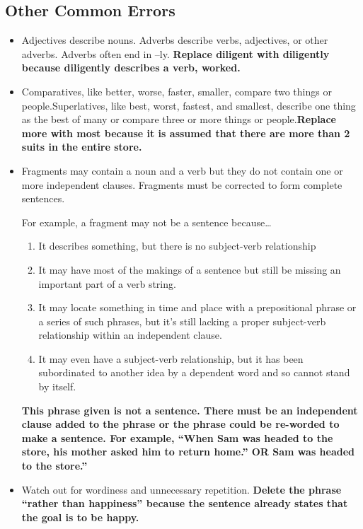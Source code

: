 \subsection{Other Common Errors}

\begin{itemize} 

\item Adjectives describe nouns. Adverbs describe verbs, adjectives, or other adverbs.  Adverbs often end in –ly. \textbf{Replace diligent with diligently because diligently describes a verb, worked.}

\item Comparatives, like better, worse, faster, smaller, compare two things or people.Superlatives, like best, worst, fastest, and smallest, describe one thing as the best of many or compare three or more things or people.\textbf{Replace more with most because it is assumed that there are more than 2 suits in the entire store.}

\item Fragments may contain a noun and a verb but they do not contain one or more independent clauses. Fragments must be corrected to form complete sentences. 

\bigskip
For example, a fragment may not be a sentence because\ldots

\begin{enumerate}
\item It describes something, but there is no subject-verb relationship
\item It may have most of the makings of a sentence but still be missing an important part of a verb string.
\item It may locate something in time and place with a prepositional phrase or a series of such phrases, but it's still lacking a proper subject-verb relationship within an independent clause.
\item It may even have a subject-verb relationship, but it has been subordinated to another idea by a dependent word and so cannot stand by itself.
\end{enumerate}

\textbf{This phrase given is not a sentence. There must be an independent clause added to the phrase or the phrase could be re-worded to make a sentence. For example, ``When Sam was headed to the store, his mother asked him to return home.'' OR Sam was headed to the store.''}

\item Watch out for wordiness and unnecessary repetition. \textbf{Delete the phrase ``rather than happiness'' because the sentence already states that the goal is to be happy.}


\end{itemize}
